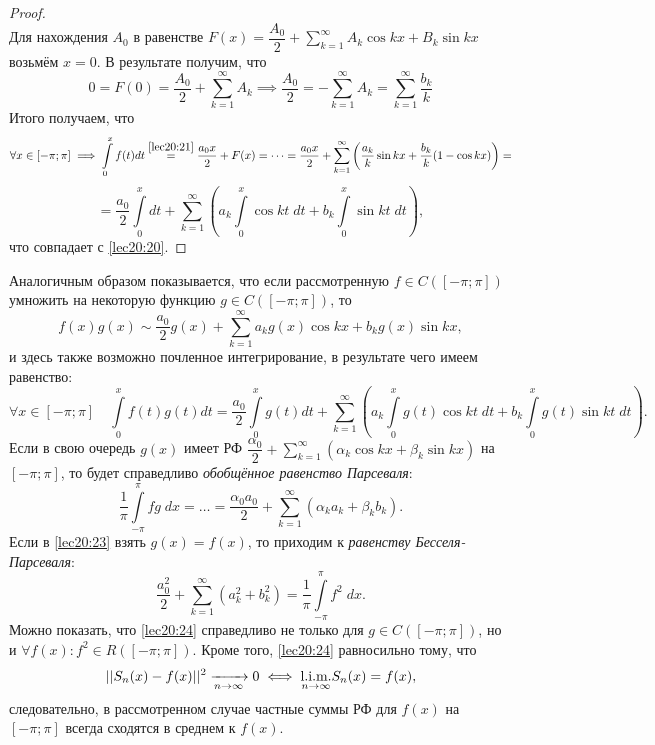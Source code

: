 \documentclass[../../main.tex]{subfiles}
\begin{document}
\begin{proof}
\[		\]
		Для нахождения $ A_0 $ в равенстве $ F(x) =
		\dfrac{A_0}{2} + \sum\limits_{k = 1}^\infty A_k\cos kx +
		B_k\sin kx $ возьмём $ x = 0 $. В результате получим, что
		\[
		0 = F(0) = \dfrac{A_0}{2} + \sum\limits_{k = 1}^\infty A_k \implies
		\dfrac{A_0}{2} = -\sum\limits_{k = 1}^\infty A_k = 
		\sum\limits_{k = 1}^\infty \dfrac{b_k}{k}
		\]
		Итого получаем, что 
		\[
		\forall x \in [-\pi; \pi] \implies
		\int\limits_0^x f(t) dt 
		\stackrel{\eqref{lec20:21}}{=}
		\dfrac{a_0x}{2} + F(x) = \dots = \dfrac{a_0x}{2} + 
		\sum\limits_{k = 1}^\infty \left(
		\dfrac{a_k}{k} \sin kx + \dfrac{b_k}{k} (1 - \cos kx)
		\right) = \] \[= \dfrac{a_0}{2} \int\limits_0^x dt +
		\sum\limits_{k = 1}^\infty \left(a_k \int\limits_0^x \cos kt\;dt +
		b_k \int\limits_0^x \sin kt\;dt\right),
		\]
		что совпадает с \eqref{lec20:20}.
	\end{proof}
	\begin{rem}
		Аналогичным образом показывается, что если рассмотренную
		$ f \in C([-\pi; \pi]) $ умножить на некоторую функцию
		$ g \in C([-\pi; \pi]) $, то \[f(x)g(x) \sim 
		\dfrac{a_0}{2}g(x) + \sum\limits_{k = 1}^\infty
		a_kg(x)\cos kx + b_kg(x)\sin kx,\] и здесь также возможно
		почленное интегрирование, в результате чего имеем равенство:
		\[
		\forall x \in [-\pi; \pi]\quad
		\int\limits_0^x f(t)g(t) dt = \dfrac{a_0}{2} 
		\int\limits_0^x g(t) dt + \sum\limits_{k = 1}^\infty
		\left(
		a_k\int\limits_0^xg(t)\cos kt\;dt + 
		b_k\int\limits_0^xg(t)\sin kt\;dt
		\right).
		\]
		Если в свою очередь $ g(x) $ имеет РФ $ 
		\dfrac{\alpha_0}{2} + \sum\limits_{k = 1}^\infty 
		(\alpha_k\cos kx + \beta_k\sin kx)$ на $ [-\pi; \pi] $, 
		то будет справедливо \emph{обобщённое равенство Парсеваля}:
		\begin{equation}
		\label{lec20:23}
			\dfrac{1}{\pi} \int\limits_{-\pi}^\pi fg\;dx =
			\dots = \dfrac{\alpha_0a_0}{2} +
			\sum\limits_{k = 1}^\infty(\alpha_ka_k + \beta_kb_k).
		\end{equation}
		Если в \eqref{lec20:23} взять $ g(x) = f(x) $, 
		то приходим к \emph{равенству Бесселя-Парсеваля}:
		\begin{equation}
		\label{lec20:24}
			\dfrac{a_0^2}{2} + \sum\limits_{k = 1}^\infty(a_k^2 + b_k^2) =
			\dfrac{1}{\pi} \int\limits_{-\pi}^\pi f^2\;dx.
		\end{equation}
		Можно показать, что \eqref{lec20:24} справедливо не только для 
		$ g \in C([-\pi; \pi]) $, но и $ \forall f(x):
		{f^2 \in R([-\pi; \pi])}$. 
		Кроме того, \eqref{lec20:24} равносильно тому, что
		\[
		||S_n(x) - f(x)||^2 \xrightarrow[n \to \infty]{} 0
		\iff \underset{n \to \infty}{\text{l.i.m.}} S_n(x) = f(x),
		\]
		следовательно, в рассмотренном случае частные суммы РФ для 
		$ f(x) $ на $ [-\pi; \pi] $ всегда сходятся в среднем к $ f(x) $.
	\end{rem}
\end{document}
